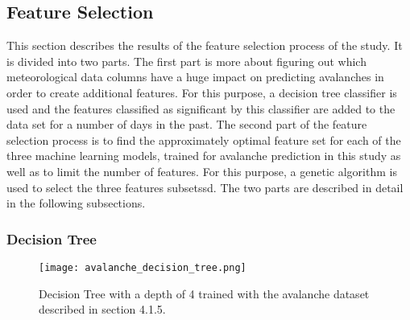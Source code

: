 \documentclass[../masterarbeit.tex]{subfiles}
\begin{document}
	




\subsection{Feature Selection}
This section describes the results of the feature selection process of the study. It is divided into two parts. The first part is more about figuring out which meteorological data columns have a huge impact on predicting avalanches in order to create additional features. For this purpose, a decision tree classifier is used and the features classified as significant by this classifier are added to the data set for a number of days in the past.
The second part of the feature selection process is to find the approximately optimal feature set for each of the three machine learning models, trained for avalanche prediction in this study as well as to limit the number of features. For this purpose, a genetic algorithm is used to select the three features subsetssd. The two parts are described in detail in the following subsections.



\subsubsection{Decision Tree}

\begin{figure}[h]
    \centering
    \texttt{[image: avalanche\_decision\_tree.png]}
    \caption{Decision Tree with a depth of 4 trained with the avalanche dataset described in section 4.1.5.}
\end{figure}
\end{document}
